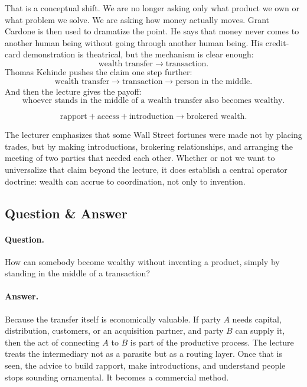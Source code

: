 That is a conceptual shift. We are no longer asking only what product we own or what problem we solve. We are asking how money actually moves. Grant Cardone is then used to dramatize the point. He says that money never comes to another human being without going through another human being. His credit-card demonstration is theatrical, but the mechanism is clear enough:
\begin{equation}
\text{wealth transfer} \to \text{transaction}.
\end{equation}
Thomas Kehinde pushes the claim one step further:
\begin{equation}
\text{wealth transfer} \to \text{transaction} \to \text{person in the middle}.
\end{equation}
And then the lecture gives the payoff:
\begin{equation}
\text{whoever stands in the middle of a wealth transfer also becomes wealthy}.
\end{equation}

\begin{figure}[h]
\centering
\begin{equation}
\text{rapport} + \text{access} + \text{introduction}
\to
\text{brokered wealth}.
\end{equation}
\end{figure}

The lecturer emphasizes that some Wall Street fortunes were made not by placing trades, but by making introductions, brokering relationships, and arranging the meeting of two parties that needed each other. Whether or not we want to universalize that claim beyond the lecture, it does establish a central operator doctrine: wealth can accrue to coordination, not only to invention.

\subsection{Question \& Answer}

\paragraph{Question.} How can somebody become wealthy without inventing a product, simply by standing in the middle of a transaction?

\paragraph{Answer.} Because the transfer itself is economically valuable. If party \(A\) needs capital, distribution, customers, or an acquisition partner, and party \(B\) can supply it, then the act of connecting \(A\) to \(B\) is part of the productive process. The lecture treats the intermediary not as a parasite but as a routing layer. Once that is seen, the advice to build rapport, make introductions, and understand people stops sounding ornamental. It becomes a commercial method.

